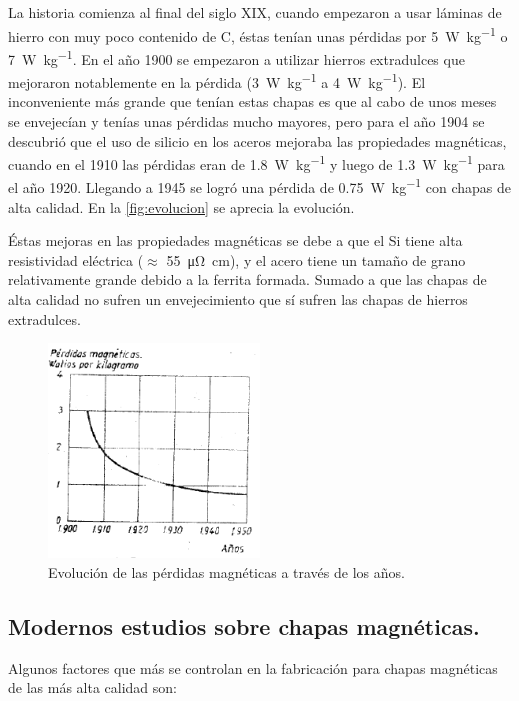 \documentclass[12pt,a4paper]{article}
\begin{document}
La historia comienza al final del siglo XIX, cuando empezaron a usar láminas de hierro con muy poco contenido de C, éstas tenían unas pérdidas por \SI{5}{\watt\per\kilogram} o \SI{7}{\watt\per\kilogram}. En el año 1900 se empezaron a utilizar hierros extradulces que mejoraron notablemente en la pérdida (\SI{3}{\watt\per\kilogram} a \SI{4}{\watt\per\kilogram}). El inconveniente más grande que tenían estas chapas es que al cabo de unos meses se envejecían y tenías unas pérdidas mucho mayores, pero para el año 1904 se descubrió que el uso de silicio en los aceros mejoraba las propiedades magnéticas, cuando en el 1910 las pérdidas eran de \SI{1,8}{\watt\per\kilogram} y luego de \SI{1,3}{\watt\per\kilogram} para el año 1920. Llegando a 1945 se logró una pérdida de \SI{0,75}{\watt\per\kilogram} con chapas de alta calidad. En la \autoref{fig:evolucion} se aprecia la evolución.

Éstas mejoras en las propiedades magnéticas se debe a que el Si tiene alta resistividad eléctrica ($\approx$ \SI{55}{\micro\ohm\centi\meter}), y el acero tiene un tamaño de grano relativamente grande debido a la ferrita formada. Sumado a que las chapas de alta calidad no sufren un envejecimiento que sí sufren las chapas de hierros extradulces.

\begin{figure}[t]    
    \centering         
    \includegraphics[width=0.5\textwidth]{IMAGENES LATEX/3.png}
    \caption{Evolución de las pérdidas magnéticas a través de los años.}
    \label{fig:evolucion}
\end{figure}

\subsection{Modernos estudios sobre chapas magnéticas.}

Algunos factores que más se controlan en la fabricación para chapas magnéticas de las más alta calidad son:
\end{document}
